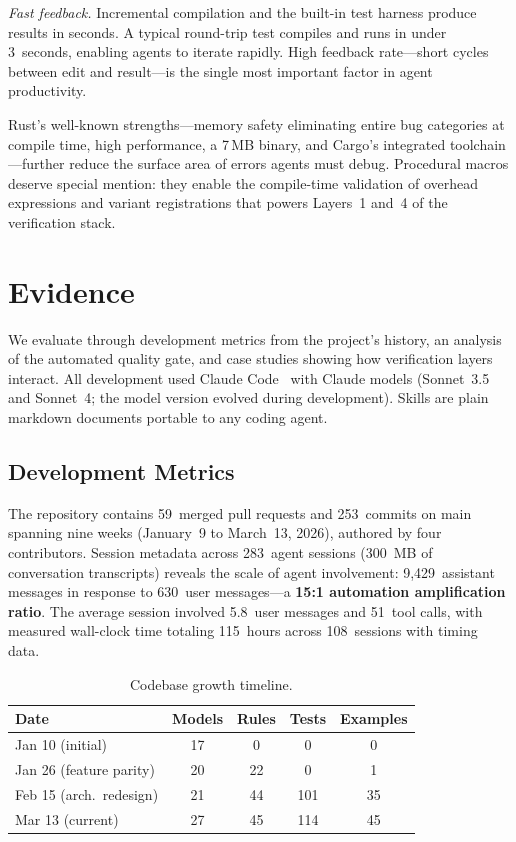 \documentclass[conference]{IEEEtran}
\begin{document}
\emph{Fast feedback.}
Incremental compilation and the built-in test harness produce results in seconds.
A typical round-trip test compiles and runs in under 3~seconds, enabling agents to iterate rapidly.
High feedback rate---short cycles between edit and result---is the single most important factor in agent productivity.

Rust's well-known strengths---memory safety eliminating entire bug categories at compile time, high performance, a 7\,MB binary, and Cargo's integrated toolchain---further reduce the surface area of errors agents must debug.
Procedural macros deserve special mention: they enable the compile-time validation of overhead expressions and variant registrations that powers Layers~1 and~4 of the verification stack.

\section{Evidence}\label{sec:evaluation}

We evaluate through development metrics from the project's history, an analysis of the automated quality gate, and case studies showing how verification layers interact.
All development used Claude Code~\cite{Anthropic2025ClaudeCode} with Claude models (Sonnet~3.5 and Sonnet~4; the model version evolved during development).
Skills are plain markdown documents portable to any coding agent.

\subsection{Development Metrics}\label{sec:metrics}

The repository contains 59~merged pull requests and 253~commits on main spanning nine weeks (January~9 to March~13, 2026), authored by four contributors.
Session metadata across 283~agent sessions (300~MB of conversation transcripts) reveals the scale of agent involvement: 9,429~assistant messages in response to 630~user messages---a \textbf{15:1 automation amplification ratio}.
The average session involved 5.8~user messages and 51~tool calls, with measured wall-clock time totaling 115~hours across 108~sessions with timing data.

\begin{table}[t]
\caption{Codebase growth timeline.}\label{tab:growth}
\centering
\small
\begin{tabular}{@{}lcccc@{}}
\toprule
Date & Models & Rules & Tests & Examples \\
\midrule
Jan 10 (initial) & 17 & 0 & 0 & 0 \\
Jan 26 (feature parity) & 20 & 22 & 0 & 1 \\
Feb 15 (arch.\ redesign) & 21 & 44 & 101 & 35 \\
Mar 13 (current) & 27 & 45 & 114 & 45 \\
\bottomrule
\end{tabular}
\end{table}
\end{document}
